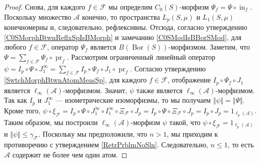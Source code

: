 \documentclass[12pt]{article}
\begin{document}
\begin{proof}
    Снова, для каждого $f\in\mathcal{F}$ мы определим 
    $C_0(S)$-морфизм $\Psi_f=\Psi\circ \operatorname{in}_f$. 
    Поскольку множество $\mathcal{A}$ конечно, то пространства $L_p(S,\mu)$ 
    и $L_1(S,\mu)$ конечномерны и, следовательно, рефлексивны. 
    Отсюда, согласно утверждению \ref{C0SMorphBtwnReflxSpIsBMorph} и 
    замечанию \ref{C0SModIsBBorSMod}, для любого $f\in\mathcal{F}$, 
    оператор $\Psi_f$ является $B(\operatorname{Bor}(S))$-морфизмом. 
    Заметим, что
    $
        \Psi=\sum_{f\in\mathcal{F}} \Psi_f\circ\operatorname{pr}_f.
    $
    Рассмотрим ограниченный линейный оператор
    $
        \psi
        =I_p\circ\Psi\circ J_1^\infty
        =\sum_{f\in\mathcal{F}} 
            I_p\circ\Psi_f\circ J_1\circ\operatorname{pr}_f.
    $
    Согласно утверждению \ref{SwtchMorphBtwnAtomMeasSp}, для 
    каждого $f\in \mathcal{F}$, отображение $I_p\circ \Psi_f\circ J_1$ является 
    $\ell_\infty(\mathcal{A})$-морфизмом. Значит, $\psi$ также является 
    $\ell_\infty(\mathcal{A})$-морфизмом. Так как $I_p$ 
    и $J_1^{\infty}$ --- изометрические изоморфизмы, то мы 
    получаем $\Vert\psi\Vert=\Vert\Psi\Vert$. Кроме того,
    $
        \psi\circ\xi_\mathcal{F}
        = I_p\circ\Psi\circ J_1^{\infty}\circ 
            I_1^{\infty}\circ \Xi_{\mathcal{F}}\circ J_p
        = I_p\circ\Psi\circ \Xi_{\mathcal{F}}\circ J_p
        = I_p\circ J_p
        = 1_{\ell_p(\mathcal{A})}.
    $
    Таким образом, мы построили $\ell_\infty(\mathcal{A})$-морфизм $\psi$
    такой, что $\psi\circ\xi_{\mathcal{F}}=1_{\ell_p(\mathcal{A})}$ 
    и $\Vert \psi\Vert\leq\gamma_{\mathcal{F}}$. Поскольку мы предположили, 
    что $n>1$, мы приходим к противоречию с утверждением \ref{RetrPrblmNoSln}. 
    Следовательно, $n\leq 1$, то есть $\mathcal{A}$ содержит не более чем один 
    атом.
\end{proof}
\end{document}
